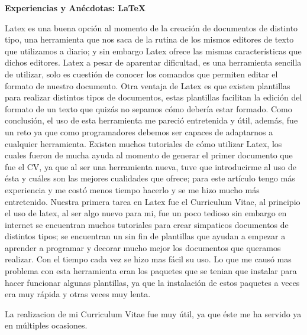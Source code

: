 \documentclass[12pt]{report}
\begin{document}
	\begingroup
		\large{
			\textbf{
				Experiencias y Anécdotas: LaTeX
				\newline
				\newline
			}
		}
	\endgroup

Latex es una buena opción al momento de la creación de documentos de distinto tipo, una herramienta que nos saca de la rutina de los mismos editores de texto que utilizamos a diario; y sin embargo Latex ofrece las mismas características que dichos editores.
\newline	
\newline	
Latex  a pesar de aparentar dificultad, es una herramienta sencilla de utilizar, solo es cuestión de conocer los comandos que permiten editar el formato de nuestro documento.
Otra ventaja de Latex es que existen plantillas para realizar distintos tipos de documentos, estas plantillas facilitan la edición del formato de un texto que quizás no sepamos cómo debería estar formado.
\newline	
\newline	
Como conclusión, el uso de esta herramienta me pareció entretenida y útil, además, fue un reto ya que como programadores debemos ser capaces de adaptarnos a cualquier herramienta.
\newline
\newline		
Existen muchos tutoriales de cómo utilizar Latex, los cuales fueron de mucha ayuda al momento de generar el primer documento que fue el CV, ya que al ser una herramienta nueva, tuve que introducirme al uso de ésta y cuáles son las mejores cualidades que ofrece; para este artículo tengo más experiencia y me costó menos tiempo hacerlo y se me hizo mucho más entretenido.
\newline
Nuestra primera tarea en Latex fue el Curriculum Vitae, al principio el uso de latex, al ser algo nuevo para mi, fue un poco tedioso sin embargo en internet se encuentran muchos tutoriales para crear simpaticos documentos de distintos tipos; se encuentran un sin fin de plantillas que ayudan a empezar a aprender a programar y decorar mucho mejor los documentos que queramos realizar.
Con el tiempo cada vez se hizo mas fácil su uso.
\newline
Lo que me causó mas problema con esta herramienta eran los paquetes que se tenian que instalar para hacer funcionar algunas plantillas, ya que la instalación de estos paquetes a veces era muy rápida y otras veces muy lenta.

La realizacion de mi Curriculum Vitae fue muy útil, ya que éste me ha servido ya en múltiples ocasiones.
\end{document}
